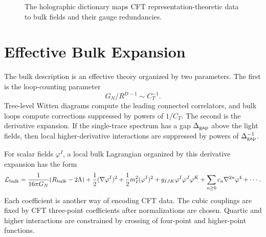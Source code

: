 \begin{figure}[H]
  \centering
  \caption{The holographic dictionary maps CFT representation-theoretic data
  to bulk fields and their gauge redundancies.}
  \label{fig:holographic-field-dictionary}
\end{figure}

\section{Effective Bulk Expansion}

The bulk description is an effective theory organized by two parameters.  The
first is the loop-counting parameter
\[
  G_N/R^{D-1}\sim C_T^{-1}.
\]
Tree-level Witten diagrams compute the leading connected correlators, and
bulk loops compute corrections suppressed by powers of \(1/C_T\).  The second
is the derivative expansion.  If the single-trace spectrum has a gap
\(\Delta_{\rm gap}\) above the light fields, then local higher-derivative
interactions are suppressed by powers of \(\Delta_{\rm gap}^{-1}\).

For scalar fields \(\varphi^I\), a local bulk Lagrangian organized by this
derivative expansion has the form
\[
  \mathcal L_{\rm bulk}
  =
  \frac1{16\pi G_N}(R_{\rm bulk}-2\Lambda)
  +
  \frac12(\nabla\varphi^I)^2
  +
  \frac12m_I^2(\varphi^I)^2
  +
  g_{IJK}\varphi^I\varphi^J\varphi^K
  +
  \sum_{n\ge0}c_n\nabla^{2n}\varphi^4+\cdots .
\]
Each coefficient is another way of encoding CFT data.  The cubic couplings
are fixed by CFT three-point coefficients after normalizations are chosen.
Quartic and higher interactions are constrained by crossing of four-point and
higher-point functions.

